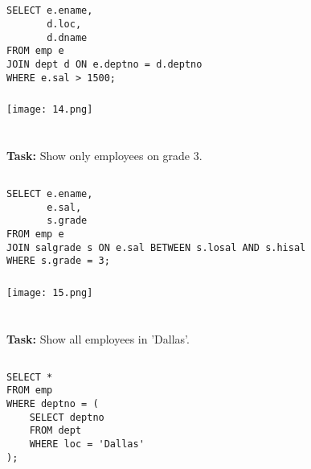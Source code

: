 \documentclass[12pt,a4paper]{article}
\begin{document}
\subsection{}
\begin{lstlisting}
SELECT e.ename,
       d.loc,
       d.dname
FROM emp e
JOIN dept d ON e.deptno = d.deptno
WHERE e.sal > 1500;
\end{lstlisting}

\subsubsection{}
\begin{center}
    \texttt{[image: 14.png]}
\end{center}


\section{}
\textbf{Task:} Show only employees on grade 3.

\subsection{}
\begin{lstlisting}
SELECT e.ename,
       e.sal,
       s.grade
FROM emp e
JOIN salgrade s ON e.sal BETWEEN s.losal AND s.hisal
WHERE s.grade = 3;
\end{lstlisting}

\subsubsection{}
\begin{center}
    \texttt{[image: 15.png]}
\end{center}


\section{}
\textbf{Task:} Show all employees in 'Dallas'.

\subsection{}
\begin{lstlisting}
SELECT *
FROM emp
WHERE deptno = (
    SELECT deptno
    FROM dept
    WHERE loc = 'Dallas'
);
\end{lstlisting}
\end{document}
